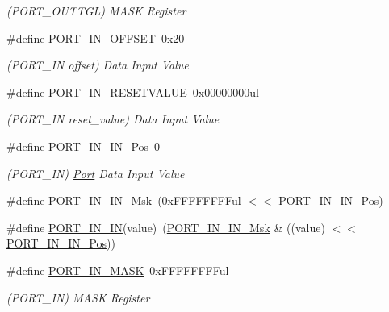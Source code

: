 \begin{DoxyCompactItemize}
\begin{DoxyCompactList}\small\item\em (P\+O\+R\+T\+\_\+\+O\+U\+T\+T\+GL) M\+A\+SK Register \end{DoxyCompactList}\item 
\#define \mbox{\hyperlink{group___s_a_m_d21___p_o_r_t_ga7ce997c987c624b541986263e20a5c43}{P\+O\+R\+T\+\_\+\+I\+N\+\_\+\+O\+F\+F\+S\+ET}}~0x20
\begin{DoxyCompactList}\small\item\em (P\+O\+R\+T\+\_\+\+IN offset) Data Input Value \end{DoxyCompactList}\item 
\#define \mbox{\hyperlink{group___s_a_m_d21___p_o_r_t_ga439d1273dd238888045148efebac2333}{P\+O\+R\+T\+\_\+\+I\+N\+\_\+\+R\+E\+S\+E\+T\+V\+A\+L\+UE}}~0x00000000ul
\begin{DoxyCompactList}\small\item\em (P\+O\+R\+T\+\_\+\+IN reset\+\_\+value) Data Input Value \end{DoxyCompactList}\item 
\#define \mbox{\hyperlink{group___s_a_m_d21___p_o_r_t_ga39fa578b833d4c48b8090804a97c918b}{P\+O\+R\+T\+\_\+\+I\+N\+\_\+\+I\+N\+\_\+\+Pos}}~0
\begin{DoxyCompactList}\small\item\em (P\+O\+R\+T\+\_\+\+IN) \mbox{\hyperlink{struct_port}{Port}} Data Input Value \end{DoxyCompactList}\item 
\#define \mbox{\hyperlink{group___s_a_m_d21___p_o_r_t_gafc8e8de4e1098dd2f63a5fb99e7a915f}{P\+O\+R\+T\+\_\+\+I\+N\+\_\+\+I\+N\+\_\+\+Msk}}~(0x\+F\+F\+F\+F\+F\+F\+F\+Ful $<$$<$ P\+O\+R\+T\+\_\+\+I\+N\+\_\+\+I\+N\+\_\+\+Pos)
\item 
\#define \mbox{\hyperlink{group___s_a_m_d21___p_o_r_t_gaf81b4172c78721d9834973dddc4841cf}{P\+O\+R\+T\+\_\+\+I\+N\+\_\+\+IN}}(value)~(\mbox{\hyperlink{group___s_a_m_d21___p_o_r_t_gafc8e8de4e1098dd2f63a5fb99e7a915f}{P\+O\+R\+T\+\_\+\+I\+N\+\_\+\+I\+N\+\_\+\+Msk}} \& ((value) $<$$<$ \mbox{\hyperlink{group___s_a_m_d21___p_o_r_t_ga39fa578b833d4c48b8090804a97c918b}{P\+O\+R\+T\+\_\+\+I\+N\+\_\+\+I\+N\+\_\+\+Pos}}))
\item 
\#define \mbox{\hyperlink{group___s_a_m_d21___p_o_r_t_gac632cdcc705e953c0b1040681bb7056a}{P\+O\+R\+T\+\_\+\+I\+N\+\_\+\+M\+A\+SK}}~0x\+F\+F\+F\+F\+F\+F\+F\+Ful
\begin{DoxyCompactList}\small\item\em (P\+O\+R\+T\+\_\+\+IN) M\+A\+SK Register \end{DoxyCompactList}\item 

\end{DoxyCompactItemize}

